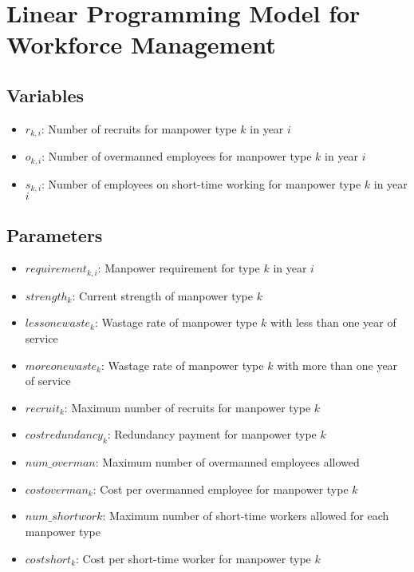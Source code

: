 \documentclass{article}
\begin{document}
\section*{Linear Programming Model for Workforce Management}

\subsection*{Variables}
\begin{itemize}
    \item \( r_{k,i} \): Number of recruits for manpower type \( k \) in year \( i \)
    \item \( o_{k,i} \): Number of overmanned employees for manpower type \( k \) in year \( i \)
    \item \( s_{k,i} \): Number of employees on short-time working for manpower type \( k \) in year \( i \)
\end{itemize}

\subsection*{Parameters}
\begin{itemize}
    \item \( requirement_{k,i} \): Manpower requirement for type \( k \) in year \( i \)
    \item \( strength_k \): Current strength of manpower type \( k \)
    \item \( lessonewaste_k \): Wastage rate of manpower type \( k \) with less than one year of service
    \item \( moreonewaste_k \): Wastage rate of manpower type \( k \) with more than one year of service
    \item \( recruit_k \): Maximum number of recruits for manpower type \( k \)
    \item \( costredundancy_k \): Redundancy payment for manpower type \( k \)
    \item \( num\_overman \): Maximum number of overmanned employees allowed
    \item \( costoverman_k \): Cost per overmanned employee for manpower type \( k \)
    \item \( num\_shortwork \): Maximum number of short-time workers allowed for each manpower type
    \item \( costshort_k \): Cost per short-time worker for manpower type \( k \)
\end{itemize}
\end{document}
